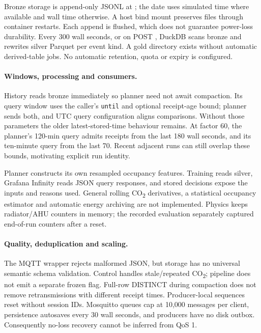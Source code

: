 \documentclass[11pt,a4paper]{article}
\begin{document}
Bronze storage is append-only JSONL at \protect{}; the date uses simulated time where available and wall time otherwise. A host bind mount preserves files through container restarts. Each append is flushed, which does not guarantee power-loss durability. Every 300 wall seconds, or on POST \protect{}, DuckDB scans bronze and rewrites silver Parquet per event kind. A gold directory exists without automatic derived-table jobs. No automatic retention, quota or expiry is configured.

\paragraph{Windows, processing and consumers.}
History reads bronze immediately so planner need not await compaction. Its query window uses the caller's \texttt{until} and optional receipt-age bound; planner sends both, and UTC query configuration aligns comparisons. Without those parameters the older latest-stored-time behaviour remains. At factor 60, the planner's 120-min query admits receipts from the last 180 wall seconds, and its ten-minute query from the last 70. Recent adjacent runs can still overlap these bounds, motivating explicit run identity.

Planner constructs its own resampled occupancy features. Training reads silver, Grafana Infinity reads JSON query responses, and stored decisions expose the inputs and reasons used. General rolling CO\textsubscript{2} derivatives, a statistical occupancy estimator and automatic energy archiving are not implemented. Physics keeps radiator/AHU counters in memory; the recorded evaluation separately captured end-of-run counters after a reset.

\paragraph{Quality, deduplication and scaling.}
The MQTT wrapper rejects malformed JSON, but storage has no universal semantic schema validation. Control handles stale/repeated CO\textsubscript{2}; pipeline does not emit a separate frozen flag. Full-row DISTINCT during compaction does not remove retransmissions with different receipt times. Producer-local sequences reset without session IDs. Mosquitto queues cap at 10,000 messages per client, persistence autosaves every 30 wall seconds, and producers have no disk outbox. Consequently no-loss recovery cannot be inferred from QoS 1.
\end{document}
